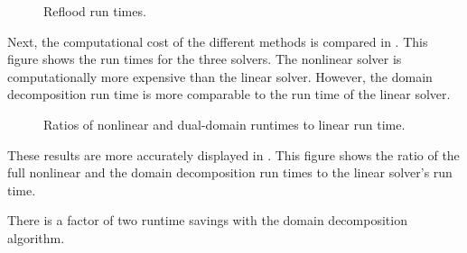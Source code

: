 \begin{figure}[h!t]
\centering

\caption{Reflood run times.}
\label{fig:refloodRunTimes}
\end{figure}

Next, the computational cost of the different methods is compared in .
This figure shows the run times for the three solvers.
The nonlinear solver is computationally more expensive than the linear solver.
However, the domain decomposition run time is more comparable to the run time of the linear solver.

\begin{figure}[h!t]
\centering

\caption{Ratios of nonlinear and dual-domain runtimes to linear run time.}
\label{fig:refloodRunTimeRatios}
\end{figure}

These results are more accurately displayed in .
This figure shows the ratio of the full nonlinear and the domain decomposition run times to the linear solver's run time.
 

 
There is a factor of two runtime savings with the domain decomposition algorithm.